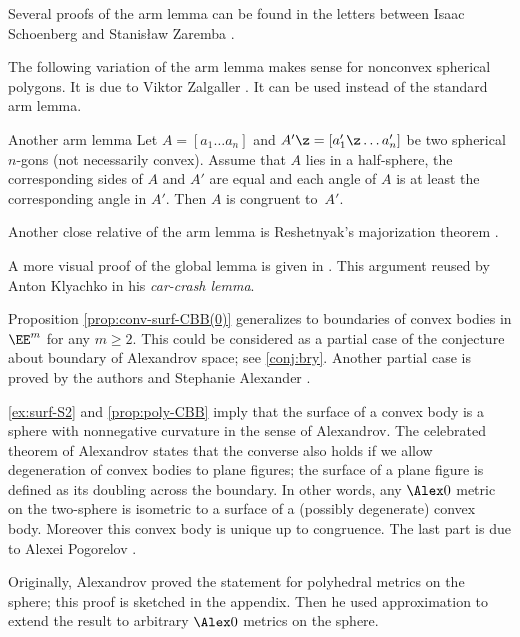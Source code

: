 Several proofs of the arm lemma can be found in the letters between Isaac Schoenberg and Stanisław Zaremba \cite{schoenberg-zaremba}.

The following variation of the arm lemma makes sense for nonconvex spherical polygons.
It is due to Viktor Zalgaller \cite{zalgaller}.
It can be used instead of the standard arm lemma.

\begin{thm}{Another arm lemma}
Let $A=[a_1\dots a_n]$ and $A'\z=[a'_1\z\dots a'_n]$ be two spherical $n$-gons (not necessarily convex).
Assume that $A$ lies in a half-sphere,
the corresponding sides of $A$ and $A'$ are equal
and each angle of $A$ is at least the corresponding angle in $A'$.
Then $A$ is congruent to~$A'$. 
\end{thm}

Another close relative of the arm lemma is Reshetnyak's majorization theorem \cite{reshetnyak}.

A more visual proof of the global lemma is given in \cite[II \S 1.3]{alexandrov}.
This argument reused by Anton Klyachko \cite{klyachko} in his \emph{car-crash lemma}.

Proposition \ref{prop:conv-surf-CBB(0)} generalizes to boundaries of convex bodies  in $\EE^m$ for any $m\ge 2$.
This could be considered as a partial case of the conjecture about boundary of Alexandrov space; see \ref{conj:bry}.
Another partial case is proved by the authors and Stephanie Alexander \cite{alexander-kapovitch-petrunin-2008}.

\ref{ex:surf-S2} and \ref{prop:poly-CBB} imply that the surface of a convex body is a sphere with nonnegative curvature in the sense of Alexandrov.
The celebrated theorem of Alexandrov states that the converse also holds if we allow degeneration of convex bodies to plane figures;
the surface of a plane figure is defined as its doubling across the boundary.
In other words, any $\Alex0$ metric on the two-sphere is isometric to a surface of a (possibly degenerate) convex body.
Moreover this convex body is unique up to congruence.
The last part is due to Alexei Pogorelov \cite{pogorelov}.

Originally, Alexandrov proved the statement for polyhedral metrics on the sphere; this proof is sketched in the appendix.
Then he used approximation to extend the result to  arbitrary $\Alex0$ metrics on the sphere.


